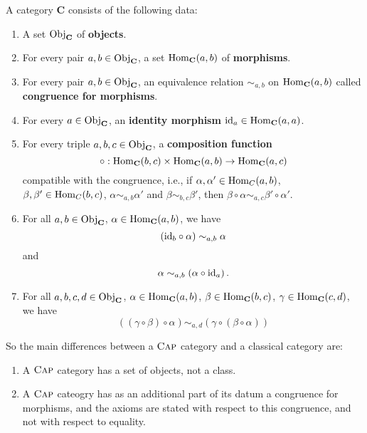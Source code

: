 \begin{definition}\label{definition:CapCategory}
 A \CapPkg category $\mathbf{C}$ consists of the following data:
 \begin{enumerate}
  \item A set $\mathrm{Obj}_{\mathbf{C}}$ of \textbf{objects}.
  \item For every pair $a,b \in \mathrm{Obj}_{\mathbf{C}}$, a set $\operatorname{\mathrm{Hom}}_{\mathbf{C}}( a, b )$ of \textbf{morphisms}.
  \item For every pair $a,b \in \mathrm{Obj}_{\mathbf{C}}$, an equivalence relation $\sim_{a,b}$ on $\operatorname{\mathrm{Hom}}_{\mathbf{C}}( a, b )$
  called \textbf{congruence for morphisms}.
  \item For every $a \in \mathrm{Obj}_{\mathbf{C}}$, an \textbf{identity morphism} $\mathrm{id}_a \in \operatorname{\mathrm{Hom}}_{\mathbf{C}}( a, a )$.
  \item For every triple $a, b, c \in \mathrm{Obj}_{\mathbf{C}}$, a \textbf{composition function}
  \[
   \circ: \operatorname{\mathrm{Hom}}_{\mathbf{C}}( b, c ) \times \operatorname{\mathrm{Hom}}_{\mathbf{C}}( a, b ) \rightarrow \operatorname{\mathrm{Hom}}_{\mathbf{C}}( a, c )
  \]
  compatible with the congruence, i.e., 
  if $\alpha, \alpha' \in \operatorname{\mathrm{Hom}}_{C}( a, b )$, 
  $\beta, \beta' \in \operatorname{\mathrm{Hom}}_{C}( b, c )$,
  $\alpha \sim_{a,b} \alpha'$ 
  and $\beta \sim_{b,c} \beta'$, 
  then $\beta \circ \alpha \sim_{a,c} \beta' \circ \alpha'$.
  \item For all $a, b \in \mathrm{Obj}_{\mathbf{C}}$, 
        $\alpha \in \operatorname{\mathrm{Hom}}_{\mathbf{C}}( a, b )$, 
        we have 
        \[
        \left( \mathrm{id}_{b} \circ \alpha \right) \sim_{a,b} \alpha
        \]
        and
        \[
        \alpha \sim_{a,b} \left( \alpha \circ \mathrm{id}_{a} \right).
        \]
  \item For all $a,b,c,d \in \mathrm{Obj}_{\mathbf{C}}$, 
        $\alpha \in \operatorname{\mathrm{Hom}}_{\mathbf{C}}( a, b )$, 
        $\beta \in \operatorname{\mathrm{Hom}}_{\mathbf{C}}( b, c )$, 
        $\gamma \in \operatorname{\mathrm{Hom}}_{\mathbf{C}}( c, d )$,
        we have
        \[
        \left(( \gamma \circ \beta ) \circ \alpha \right) \sim_{a,d} \left( \gamma \circ ( \beta \circ \alpha ) \right)
        \]
 \end{enumerate}
\end{definition}

So the main differences between a $\textsc{Cap}$ category and a classical category are:
\begin{enumerate}
 \item A $\textsc{Cap}$ category has a set of objects, not a class.
 \item A $\textsc{Cap}$ cateogry has as an additional part of its datum a congruence for morphisms, and the
 axioms are stated with respect to this congruence, and not with respect to equality.
\end{enumerate}

